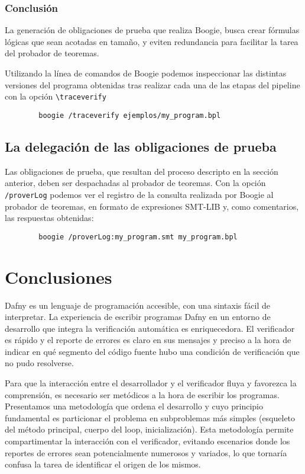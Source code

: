 \documentclass[12pt, a4paper, openany, fleqn]{book}
\begin{document}
    \subsection*{Conclusión}

    La generación de obligaciones de prueba que realiza Boogie, busca crear fórmulas lógicas que sean acotadas en tamaño, y eviten redundancia para facilitar la tarea del probador de teoremas.
  
    Utilizando la línea de comandos de Boogie podemos inspeccionar las distintas versiones del programa obtenidas tras realizar cada una de las etapas del pipeline con la opción \verb|\traceverify|
    \begin{verbatim}
        boogie /traceverify ejemplos/my_program.bpl
    \end{verbatim}

    \section{La delegación de las obligaciones de prueba}
    Las obligaciones de prueba, que resultan del proceso descripto en la sección anterior, deben ser despachadas al probador de teoremas.
    Con la opción \verb|/proverLog| podemos ver el registro de la consulta realizada por Boogie al probador de teoremas, en formato de expresiones SMT-LIB y, como comentarios, las respuestas obtenidas:
    \begin{verbatim}
        boogie /proverLog:my_program.smt my_program.bpl
    \end{verbatim}

    \chapter{Conclusiones}
    Dafny es un lenguaje de programación accesible, con una sintaxis fácil de interpretar. La experiencia de escribir programas Dafny en un entorno de desarrollo que integra la verificación automática es enriquecedora. El verificador es rápido y el reporte de errores es claro en sus mensajes y preciso a la hora de indicar en qué segmento del código fuente hubo una condición de verificación que no pudo resolverse.

    Para que la interacción entre el desarrollador y el verificador fluya y favorezca la comprensión, es necesario ser metódicos a la hora de escribir los programas. Presentamos una metodología que ordena el desarrollo y cuyo principio fundamental es particionar el problema en subproblemas más simples (esqueleto del método principal, cuerpo del loop, inicialización). Esta metodología permite compartimentar la interacción con el verificador, evitando escenarios donde los reportes de errores sean potencialmente numerosos y variados, lo que tornaría confusa la tarea de identificar el origen de los mismos.
\end{document}
